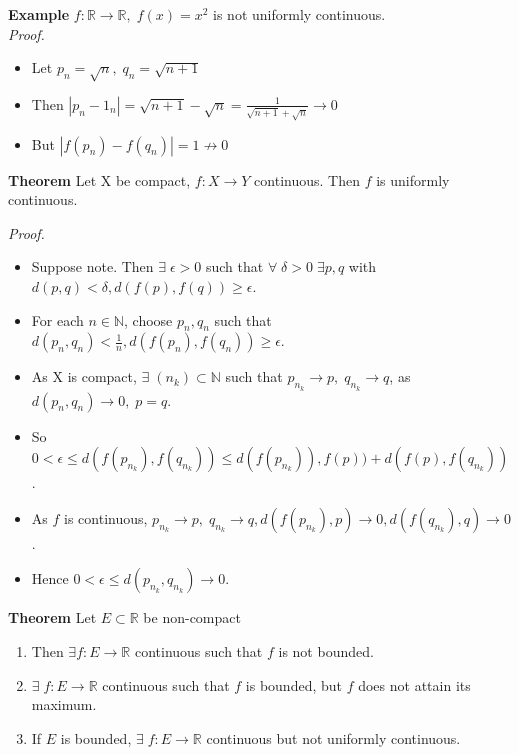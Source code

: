 \documentclass[12pt]{article}
\begin{document}
\vspace{1.5\baselineskip}
{\bf Example} $f: \mathbb{R}\rightarrow\mathbb{R},\;f(x)=x^2$ is not uniformly continuous.\\

{\sl Proof.}

\begin{itemize}
    \item Let $p_n=\sqrt{n},\;q_n=\sqrt{n+1}$
    \item Then $|p_n-1_n| = \sqrt{n+1}-\sqrt{n} = \frac{1}{\sqrt{n+1}+\sqrt{n}}\rightarrow 0$
    \item But $|f(p_n) - f(q_n)|=1 \nrightarrow 0$
\end{itemize}

\vspace{1.5\baselineskip}
\begin{block}{\bf Theorem} Let X be compact, $f:X\rightarrow Y$ continuous. Then $f$ is uniformly continuous.\end{block}

\vspace{1.5\baselineskip}
{\sl Proof.}
\begin{itemize}
    \item Suppose note. Then $\exists\;\epsilon>0$ such that $\forall\;\delta>0 \;\exists p,q$ with $d(p,q)<\delta, d(f(p),f(q))\ge \epsilon$.
    \item For each $n\in \mathbb{N}$, choose $p_n, q_n$ such that $d(p_n,q_n)<\frac{1}{n}, d(f(p_n),f(q_n))\ge \epsilon$.
    \item As X is compact, $\exists\;(n_k)\subset \mathbb{N}$ such that $p_{n_k}\rightarrow p,\; q_{n_k}\rightarrow q$, as $d(p_n,q_n) \rightarrow 0,\;p=q$.
    \item So $0<\epsilon\le d(f(p_{n_k}), f(q_{n_k})) \le d(f(p_{n_k})), f(p))+d(f(p),f(q_{n_k}))$.
    \item As $f$ is continuous, $p_{n_k}\rightarrow p,\;q_{n_k} \rightarrow q, d(f(p_{n_k}),p)\rightarrow 0, d(f(q_{n_k}),q)\rightarrow 0$.
    \item Hence $0<\epsilon \le d(p_{n_k}, q_{n_k}) \rightarrow 0$.
\end{itemize}

\vspace{1.5\baselineskip}
\begin{block}{\bf Theorem} Let $E\subset \mathbb{R}$ be non-compact
\begin{enumerate}[label=(\roman*)]
    \item Then $\exists f:E\rightarrow \mathbb{R}$ continuous such that $f$ is not bounded.
    \item $\exists\;f:E\rightarrow \mathbb{R}$ continuous such that $f$ is bounded, but $f$ does not attain its maximum.
    \item If $E$ is bounded, $\exists\; f: E\rightarrow \mathbb{R}$ continuous but not uniformly continuous.
\end{enumerate}
\end{block}
\end{document}
